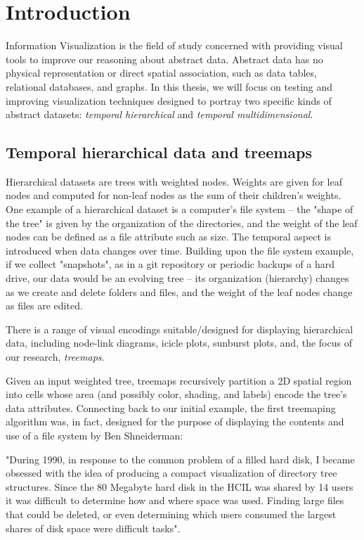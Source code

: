 \chapter{Introduction}

Information Visualization is the field of study concerned with providing visual tools to improve our reasoning about abstract data. Abstract data has no physical representation or direct spatial association, such as data tables, relational databases, and graphs.
In this thesis, we will focus on testing and improving visualization techniques designed to portray two specific kinds of abstract datasets: \emph{temporal hierarchical} and \emph{temporal multidimensional}.

\section{Temporal hierarchical data and treemaps}

Hierarchical datasets are trees with weighted nodes. Weights are given for leaf nodes and computed for non-leaf nodes as the sum of their children's weights. One example of a hierarchical dataset is a computer's file system -- the "shape of the tree" is given by the organization of the directories, and the weight of the leaf nodes can be defined as a file attribute such as size.
The temporal aspect is introduced when data changes over time. Building upon the file system example, if we collect "snapshots", as in a git repository or periodic backups of a hard drive, our data would be an evolving tree -- its organization (hierarchy) changes as we create and delete folders and files, and the weight of the leaf nodes change as files are edited.

There is a range of visual encodings suitable/designed for displaying hierarchical data, including node-link diagrams, icicle plots, sunburst plots, and, the focus of our research, \emph{treemaps}.

Given an input weighted tree, treemaps recursively partition a 2D spatial region into cells whose area (and possibly color, shading, and labels) encode the tree's data attributes. 
Connecting back to our initial example, the first treemaping algorithm was, in fact, designed for the purpose of displaying the contents and use of a file system by Ben Shneiderman:

\begin{quoting}
    "During 1990, in response to the common problem of a filled hard disk, I became obsessed with the idea of producing a compact visualization of directory tree structures. Since the 80 Megabyte hard disk in the HCIL was shared by 14 users it was difficult to determine how and where space was used. Finding large files that could be deleted, or even determining which users consumed the largest shares of disk space were difficult tasks".
\end{quoting}

